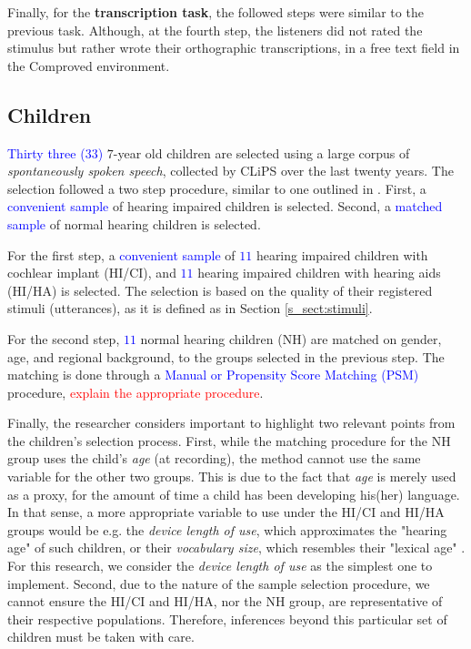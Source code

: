 Finally, for the \textbf{transcription task}, the followed steps were similar to the previous task. Although, at the fourth step, the listeners did not rated the stimulus but rather wrote their orthographic transcriptions, in a free text field in the Comproved environment.
%
%
\subsection{Children} \label{s_sect:children}
%
\textcolor{blue}{Thirty three ($33$)} $7$-year old children are selected using a large corpus of \textit{spontaneously spoken speech}, collected by CLiPS over the last twenty years. The selection followed a two step procedure, similar to one outlined in \citet{Faes_et_al_2021}. First, a \textcolor{blue}{convenient sample} of hearing impaired children is selected. Second, a \textcolor{blue}{matched sample} of normal hearing children is selected.

For the first step, a \textcolor{blue}{convenient sample} of \textcolor{blue}{$11$} hearing impaired children with cochlear implant (HI/CI), and \textcolor{blue}{$11$} hearing impaired children with hearing aids (HI/HA) is selected. The selection is based on the quality of their registered stimuli (utterances), as it is defined as in Section \ref{s_sect:stimuli}.

For the second step, \textcolor{blue}{$11$} normal hearing children (NH) are matched on gender, age, and regional background, to the groups selected in the previous step. The matching is done through a \textcolor{blue}{Manual or Propensity Score Matching (PSM)} procedure, \textcolor{red}{explain the appropriate procedure}.

Finally, the researcher considers important to highlight two relevant points from the children's selection process. First, while the matching procedure for the NH group uses the child's \textit{age} (at recording), the method cannot use the same variable for the other two groups. This is due to the fact that \textit{age} is merely used as a proxy, for the amount of time a child has been developing his(her) language. In that sense, a more appropriate variable to use under the HI/CI and HI/HA groups would be e.g. the \textit{device length of use}, which approximates the "hearing age" of such children, or their \textit{vocabulary size}, which resembles their "lexical age" \citep{Faes_et_al_2021}. For this research, we consider the \textit{device length of use} as the simplest one to implement. Second, due to the nature of the sample selection procedure, we cannot ensure the HI/CI and HI/HA, nor the NH group, are representative of their respective populations. Therefore, inferences beyond this particular set of children must be taken with care.

